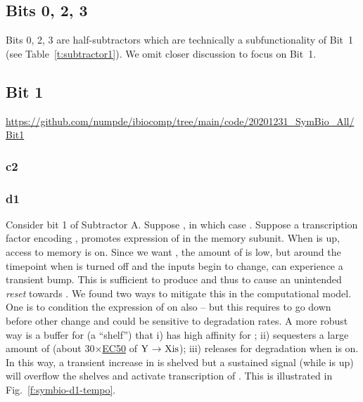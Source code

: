 \documentclass[12pt,notitlepage]{article}
\newcommand{\act}{\ {\ensuremath{\mathbin{\to}}}\ }
\begin{document}
\subsection{Bits 0, 2, 3}

Bits 0, 2, 3 are half-subtractors
which are technically a subfunctionality of Bit~1
(see Table~\ref{t:subtractor1}).
%
We omit closer discussion to focus on Bit~1.


\subsection{Bit 1} \label{s:sim:bit1}

\url{https://github.com/numpde/ibiocomp/tree/main/code/20201231_SymBio_All/Bit1}

\subsubsection*{c2} \label{s:sim:bit1:c2}



\subsubsection*{d1} \label{s:sim:bit1:d1}

Consider bit 1 of Subtractor A.
%
Suppose ,
in which case .
%
Suppose a transcription factor 
encoding ,
promotes expression of  in the memory subunit.
%
%
When  is up,
access to memory is on.
%
Since we want ,
the amount of  is low,
but
around the timepoint when 
 is turned off
and the inputs begin to change,
 can experience a transient bump.
%
This is sufficient to produce 
and thus to cause an unintended \emph{reset}
towards .
%
We found two ways to mitigate this
in the computational model.
%
One is to condition the expression of 
on  also
--
but this requires  to go down
before other change
and could be sensitive to degradation rates.
%
A more robust way
is a buffer for 
(a ``shelf'')
that 
%
i)
has high affinity for ;
%
ii)
sequesters 
a large amount of 
(about 30$\times$\href{https://en.wikipedia.org/wiki/EC50}{EC50} of $\ce{Y} \act \ce{Xis}$);
%
iii)
releases  for degradation when  is on.
%
In this way, 
a transient increase in  is shelved
but a sustained signal 
(while  is up)
will overflow the shelves and activate 
transcription of .
%
%
This is illustrated in Fig.~\ref{f:symbio-d1-tempo}.
\end{document}
